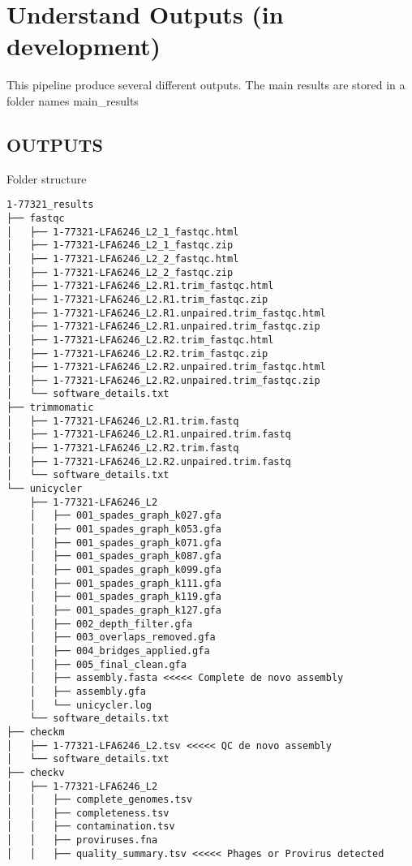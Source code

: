 \documentclass[
]{book}
\begin{document}
\hypertarget{understand-outputs-in-development}{%
\chapter{Understand Outputs (in development)}\label{understand-outputs-in-development}}

This pipeline produce several different outputs. The main results are stored in a folder names main\_results

\hypertarget{outputs}{%
\section{OUTPUTS}\label{outputs}}

Folder structure

\begin{verbatim}
1-77321_results
├── fastqc
│   ├── 1-77321-LFA6246_L2_1_fastqc.html
│   ├── 1-77321-LFA6246_L2_1_fastqc.zip
│   ├── 1-77321-LFA6246_L2_2_fastqc.html
│   ├── 1-77321-LFA6246_L2_2_fastqc.zip
│   ├── 1-77321-LFA6246_L2.R1.trim_fastqc.html
│   ├── 1-77321-LFA6246_L2.R1.trim_fastqc.zip
│   ├── 1-77321-LFA6246_L2.R1.unpaired.trim_fastqc.html
│   ├── 1-77321-LFA6246_L2.R1.unpaired.trim_fastqc.zip
│   ├── 1-77321-LFA6246_L2.R2.trim_fastqc.html
│   ├── 1-77321-LFA6246_L2.R2.trim_fastqc.zip
│   ├── 1-77321-LFA6246_L2.R2.unpaired.trim_fastqc.html
│   ├── 1-77321-LFA6246_L2.R2.unpaired.trim_fastqc.zip
│   └── software_details.txt
├── trimmomatic
│   ├── 1-77321-LFA6246_L2.R1.trim.fastq
│   ├── 1-77321-LFA6246_L2.R1.unpaired.trim.fastq
│   ├── 1-77321-LFA6246_L2.R2.trim.fastq
│   ├── 1-77321-LFA6246_L2.R2.unpaired.trim.fastq
│   └── software_details.txt
└── unicycler
    ├── 1-77321-LFA6246_L2
    │   ├── 001_spades_graph_k027.gfa
    │   ├── 001_spades_graph_k053.gfa
    │   ├── 001_spades_graph_k071.gfa
    │   ├── 001_spades_graph_k087.gfa
    │   ├── 001_spades_graph_k099.gfa
    │   ├── 001_spades_graph_k111.gfa
    │   ├── 001_spades_graph_k119.gfa
    │   ├── 001_spades_graph_k127.gfa
    │   ├── 002_depth_filter.gfa
    │   ├── 003_overlaps_removed.gfa
    │   ├── 004_bridges_applied.gfa
    │   ├── 005_final_clean.gfa
    │   ├── assembly.fasta <<<<< Complete de novo assembly
    │   ├── assembly.gfa
    │   └── unicycler.log
    └── software_details.txt
├── checkm
│   ├── 1-77321-LFA6246_L2.tsv <<<<< QC de novo assembly
│   └── software_details.txt
├── checkv 
│   ├── 1-77321-LFA6246_L2
│   │   ├── complete_genomes.tsv
│   │   ├── completeness.tsv
│   │   ├── contamination.tsv
│   │   ├── proviruses.fna
│   │   ├── quality_summary.tsv <<<<< Phages or Provirus detected

\end{verbatim}
\end{document}
